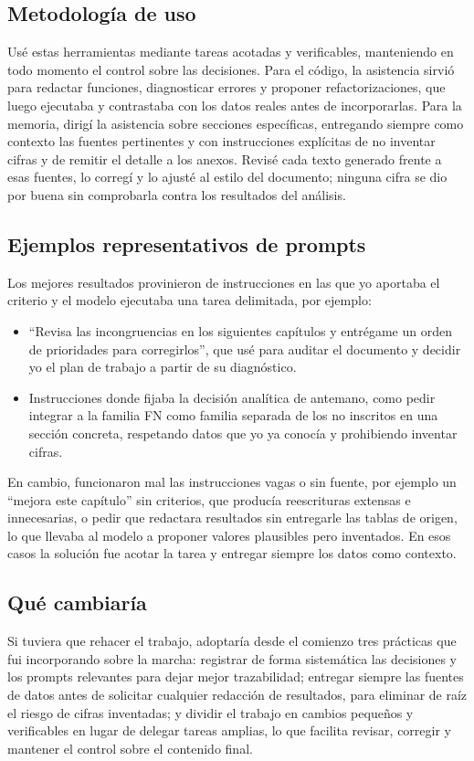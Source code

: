 \subsection*{Metodología de uso}

Usé estas herramientas mediante tareas acotadas y verificables, manteniendo en
todo momento el control sobre las decisiones. Para el código, la asistencia sirvió
para redactar funciones, diagnosticar errores y proponer refactorizaciones, que
luego ejecutaba y contrastaba con los datos reales antes de incorporarlas. Para
la memoria, dirigí la asistencia sobre secciones específicas, entregando siempre
como contexto las fuentes pertinentes y con instrucciones explícitas de no
inventar cifras y de remitir el detalle a los anexos. Revisé cada texto generado
frente a esas fuentes, lo corregí y lo ajusté al estilo del documento; ninguna
cifra se dio por buena sin comprobarla contra los resultados del análisis.

\subsection*{Ejemplos representativos de prompts}

Los mejores resultados provinieron de instrucciones en las que yo aportaba el
criterio y el modelo ejecutaba una tarea delimitada, por ejemplo:

\begin{itemize}
  \item ``Revisa las incongruencias en los siguientes capítulos y entrégame un
  orden de prioridades para corregirlos'', que usé para auditar el documento y
  decidir yo el plan de trabajo a partir de su diagnóstico.
  \item Instrucciones donde fijaba la decisión analítica de antemano, como pedir
  integrar a la familia FN como familia separada de los no inscritos en una
  sección concreta, respetando datos que yo ya conocía y prohibiendo inventar
  cifras.
\end{itemize}

En cambio, funcionaron mal las instrucciones vagas o sin fuente, por ejemplo un
``mejora este capítulo'' sin criterios, que producía reescrituras extensas e
innecesarias, o pedir que redactara resultados sin entregarle las tablas de
origen, lo que llevaba al modelo a proponer valores plausibles pero inventados.
En esos casos la solución fue acotar la tarea y entregar siempre los datos como
contexto.

\subsection*{Qué cambiaría}

Si tuviera que rehacer el trabajo, adoptaría desde el comienzo tres prácticas que
fui incorporando sobre la marcha: registrar de forma sistemática las decisiones y
los prompts relevantes para dejar mejor trazabilidad; entregar siempre las
fuentes de datos antes de solicitar cualquier redacción de resultados, para
eliminar de raíz el riesgo de cifras inventadas; y dividir el trabajo en cambios
pequeños y verificables en lugar de delegar tareas amplias, lo que facilita
revisar, corregir y mantener el control sobre el contenido final.
